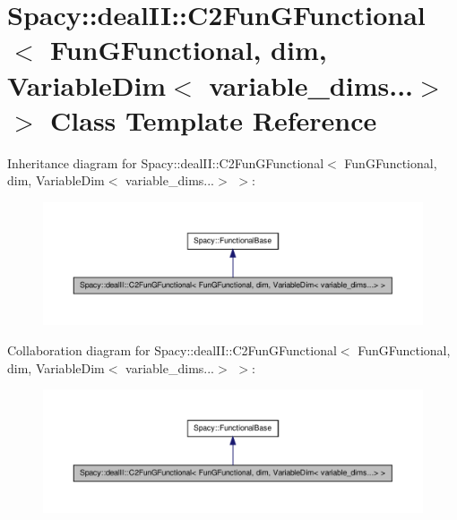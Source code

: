 \hypertarget{classSpacy_1_1dealII_1_1C2FunGFunctional_3_01FunGFunctional_00_01dim_00_01VariableDim_3_01variable__dims_8_8_8_4_01_4}{\section{\-Spacy\-:\-:deal\-I\-I\-:\-:\-C2\-Fun\-G\-Functional$<$ \-Fun\-G\-Functional, dim, \-Variable\-Dim$<$ variable\-\_\-dims...$>$ $>$ \-Class \-Template \-Reference}
\label{classSpacy_1_1dealII_1_1C2FunGFunctional_3_01FunGFunctional_00_01dim_00_01VariableDim_3_01variable__dims_8_8_8_4_01_4}
}


\-Inheritance diagram for \-Spacy\-:\-:deal\-I\-I\-:\-:\-C2\-Fun\-G\-Functional$<$ \-Fun\-G\-Functional, dim, \-Variable\-Dim$<$ variable\-\_\-dims...$>$ $>$\-:
\nopagebreak
\begin{figure}[H]
\begin{center}
\leavevmode
\includegraphics[width=350pt]{classSpacy_1_1dealII_1_1C2FunGFunctional_3_01FunGFunctional_00_01dim_00_01VariableDim_3_01variabdd2f0a36ce4d88162e913acd09d473fb}
\end{center}
\end{figure}


\-Collaboration diagram for \-Spacy\-:\-:deal\-I\-I\-:\-:\-C2\-Fun\-G\-Functional$<$ \-Fun\-G\-Functional, dim, \-Variable\-Dim$<$ variable\-\_\-dims...$>$ $>$\-:
\nopagebreak
\begin{figure}[H]
\begin{center}
\leavevmode
\includegraphics[width=350pt]{classSpacy_1_1dealII_1_1C2FunGFunctional_3_01FunGFunctional_00_01dim_00_01VariableDim_3_01variab838214f93d7ab853f70291fd32313117}
\end{center}
\end{figure}

